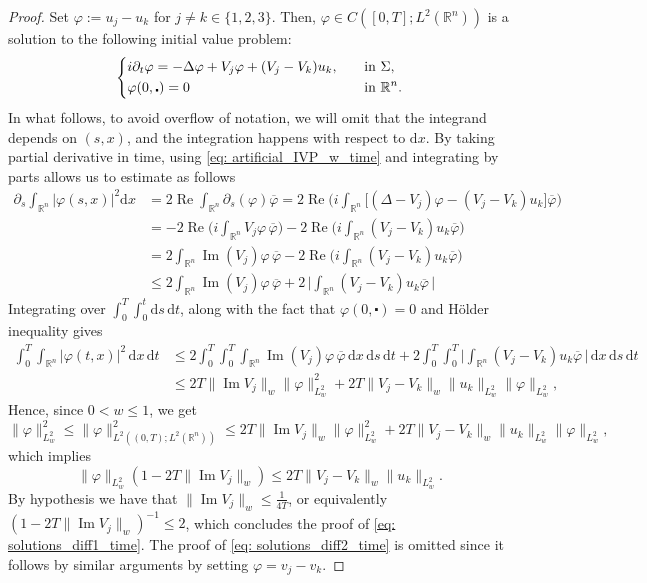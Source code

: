 \documentclass[10pt,a4paper]{amsart}
\theoremstyle{remark}
\theoremstyle{definition}
\newcommand{\R}{\mathbb{R}}
\newcommand{\dd}{\mathrm{d}}
\def\Im{\mathop\mathrm{Im}}
\def\Re{\mathop\mathrm{Re}}
\def\vp{\varphi}
\def\ovl{\overline}
\def\cd{\centerdot}
\def\d{\partial}
\begin{document}
\begin{proof}
	Set $\vp := u_j - u_k$ for $j\neq k\in\{1, 2, 3\}$. Then,  $\vp \in C([0,T];L^2(\R^n))$ is a solution to the following initial value problem:
%
\begin{equation}\label{eq: artificial_IVP_w_time}
%
\begin{dcases}
i\d_t \vp = -\Delta \vp + V_j \vp + (V_j-V_k)u_k, \quad &\textup{in}\,\, \Sigma, \\
\vp (0, \cd) = 0  &\textup{in}\,\, \R^n.
\end{dcases} 
%
\end{equation}
%
In what follows, to avoid overflow of notation, we will omit that the integrand depends on $(s,x)$, and the integration happens with respect to $\dd x$.
By taking partial derivative in time, using \eqref{eq: artificial_IVP_w_time} and integrating by parts allows us to estimate as follows 
%
\begin{align*}
\d_s \int_{\R^n} |\vp(s, x)|^2\dd x &= 2 \Re \int_{\R^n} \partial_s(\vp ) \ovl{\vp} 
= 2\Re \Big( i \int_{\R^n} \big[ (\Delta - V_j)\vp  - (V_j-V_k)u_k \big] \ovl{\vp} \Big) \\
%
&= -2 \Re \Big( i \int_{\R^n} V_j \vp \, \ovl{\vp} \Big) - 2\Re \Big( i \int_{\R^n} (V_j-V_k) u_k \ovl{\vp} \Big) \\
%
&=  2 \int_{\R^n} \Im(V_j) \vp \, \ovl{\vp } - 2\Re \Big( i \int_{\R^n} (V_j-V_k) u_k \ovl{\vp} \Big)  \\
%
&\leq 2 \int_{\R^n} \Im(V_j) \vp  \, \ovl{\vp } + 2\,\Big| \int_{\R^n} (V_j-V_k)u_k \ovl{\vp}\, \Big|
%
\end{align*}
%
Integrating over $\int_0^T \int_0^t\dd s \, \dd t$, along with the fact that $\vp(0,\cd)=0$ and H\"older inequality gives
%
\begin{align*}
\int_0^T \int_{\R^n} |\vp (t,x)|^2\,\dd x \, \dd t &\leq 2 \int_0^T \int_0^T\int_{\R^n} \Im(V_j) \vp  \, \ovl{\vp}\, \dd x \, \dd s \, \dd t + 
2 \int_0^T \int_0^T \Big| \int_{\R^n} (V_j-V_k)u_k \ovl{\vp}\, \Big| \, \dd x \, \dd s \, \dd t \\
%
&\leq 2T \| \Im V_j\|_{w}\|\vp\|_{L^2_w}^2+2T \| V_j-V_k\|_{w} \|u_k\|_{L^2_w}\|\vp\|_{L^2_w} ,
\end{align*}
%
Hence, since $0<w\leq 1$, we get
%
\[
\|\vp\|_{L^2_w}^2\leq \|\vp\|_{L^2((0, T); L^2(\R^n))}^2 \leq 2T \| \Im V_j\|_{w}\|\vp\|_{L^2_w}^2+2T \| V_j-V_k\|_{w} \|u_k\|_{L^2_w}\|\vp\|_{L^2_w},
\]
%
which implies
%
\[
\|\vp\|_{L^2_w}\left(1-2T\| \Im V_j\|_{w}\right)\leq 2T \| V_j-V_k\|_{w} \|u_k\|_{L^2_w}.
\]
%
By hypothesis we have that $\|  \Im V_j \|_{w} \leq \frac{1}{4T} $, or equivalently $\left(1-2T \| \Im V_j\|_{w}\right)^{-1}\leq 2$, which concludes the proof of \eqref{eq: solutions_diff1_time}. The proof of \eqref{eq: solutions_diff2_time} is omitted since it follows by similar arguments by setting $\vp=v_j-v_k$.
%
\end{proof}
\end{document}
